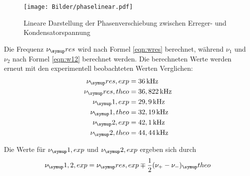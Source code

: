 \begin{figure}[!h]
  \centering
  \texttt{[image: Bilder/phaselinear.pdf]}
  \caption{Lineare Darstellung der Phasenverschiebung zwischen Erreger- und
  Kondensatorspannung}
  \label{fig:phse}
\end{figure}
Die Frequenz $\nu_\su{res}$ wird nach Formel \eqref{eqn:wres} berechnet,
während $\nu_1$ und $\nu_2$ nach Formel \eqref{eqn:w12} berechnet werden.
Die berechneten Werte werden erneut mit den experimentell beobachteten Werten
Verglichen:
\begin{align*}
  \nu_\su{res,exp} &= 36\kHz \\
  \nu_\su{res,theo}&= 36,822 \kHz \\
  \nu_\su{1,exp} &= 29,9\kHz \\
  \nu_\su{1,theo}&=32,19\kHz \\
  \nu_\su{2,exp} &= 42,1 \kHz \\
  \nu_\su{2,theo}&= 44,44\kHz
\end{align*}

Die Werte für $\nu_\su{1,exp}$ und $\nu_\su{2,exp}$ ergeben sich durch
\begin{equation*}
  \nu_\su{1, 2, exp} = \nu_\su{res,exp} \mp \frac{1}{2}(\nu_+ - \nu_-)_\su{theo}
\end{equation*}
